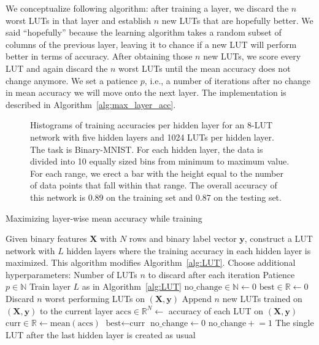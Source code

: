 We conceptualize following algorithm: after training a layer, we discard the $n$ worst LUTs in that layer and establish $n$ new LUTs that are hopefully better. We said \enquote{hopefully} because the learning algorithm takes a random subset of columns of the previous layer, leaving it to chance if a new LUT will perform better in terms of accuracy. After obtaining those $n$ new LUTs, we score every LUT and again discard the $n$ worst LUTs until the mean accuracy does not change anymore. We set a patience $p$, i.e., a number of iterations after no change in mean accuracy we will move onto the next layer. The implementation is described in Algorithm~\ref{alg:max_layer_acc}.

\begin{figure}[!htb]
    \centering
    
    \caption{Histograms of training accuracies per hidden layer for an 8-LUT network with five hidden layers and 1024 LUTs per hidden layer. The task is Binary-MNIST. For each hidden layer, the data is divided into 10 equally sized bins from minimum to maximum value. For each range, we erect a bar with the height equal to the number of data points that fall within that range. The overall accuracy of this network is 0.89 on the training set and 0.87 on the testing set.}
\label{fig:acc_layer_normal}
\end{figure}
\FloatBarrier

\begin{algorithm}
  \caption{Maximizing layer-wise mean accuracy while training}
  \label{alg:max_layer_acc}
  \begin{algorithmic}
    \State Given binary features $\bm{X}$ with $N$ rows and binary label vector $\bm{y}$, construct a LUT network with $L$ hidden layers where the training accuracy in each hidden layer is maximized. This algorithm modifies Algorithm~\ref{alg:LUT}.
    \vspace{1em}
    \State Choose additional hyperparameters:
    \Statein Number of LUTs $n$ to discard after each iteration
    \Statein Patience $p \in \mathds{N}$
      \State Train layer $L$ as in Algorithm~\ref{alg:LUT}
      \State $\text{no\_change} \in \mathds{N} \gets 0$
      \State $\text{best} \in \mathds{R} \gets 0$
      \State Discard $n$ worst performing LUTs on $(\bm{X}, \bm{y})$
      \State Append $n$ new LUTs trained on $(\bm{X}, \bm{y})$ to the current layer
        \State $\text{accs} \in \mathds{R}^N \gets $ accuracy of each LUT on $(\bm{X}, \bm{y})$
        \State $\text{curr} \in \mathds{R} \gets \text{mean}(\text{accs})$
          \State $\text{best} \gets \text{curr}$
          \State $\text{no\_change} \gets 0$
          \Else
            \State $\text{no\_change} \mathrel{+}= 1$
        \EndIf
      \EndWhile
    \EndFor
    \State The single LUT after the last hidden layer is created as usual
  \end{algorithmic}
\end{algorithm}
\FloatBarrier

